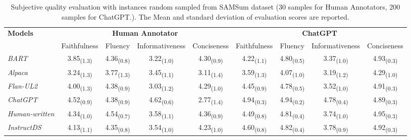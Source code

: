 \documentclass[11pt]{article}
\begin{document}
\begin{table*}[t]
        \centering
        \begin{adjustbox}{width=1.0\textwidth,center}
        \begin{tabular}{ | l | c c c c | c c c c | }
        \toprule
        \multirow{2}{*}{\textbf{Models}} & \multicolumn{4}{c|}{\textbf{Human Annotator}} & \multicolumn{4}{c|}{\textbf{ChatGPT}} \\ \cline{2-9}
         & Faithfulness & Fluency & Informativeness & Conciseness & Faithfulness & Fluency & Informativeness & Conciseness  \\
        \hline
        \emph{BART} & 3.85\textsubscript{(1.3)} & 4.36\textsubscript{(0.8)} & 3.22\textsubscript{(1.0)} & 4.30\textsubscript{(0.9)} & 4.22\textsubscript{(1.1)} & 4.80\textsubscript{(0.5)} & 3.37\textsubscript{(1.0)} & 4.93\textsubscript{(0.3)} \\
        \emph{Alpaca} & 3.24\textsubscript{(1.3)} & 3.77\textsubscript{(1.3)} & 3.45\textsubscript{(1.1)} & 3.11\textsubscript{(1.4)} & 3.59\textsubscript{(1.3)} & 4.07\textsubscript{(1.0)} & 3.19\textsubscript{(1.2)} & 4.29\textsubscript{(1.0)} \\
        \emph{Flan-UL2} & 4.00\textsubscript{(1.3)} & 4.38\textsubscript{(0.9)} & 3.03\textsubscript{(1.2)} & 4.29\textsubscript{(1.0)} & 4.45\textsubscript{(0.9)} & 4.78\textsubscript{(0.5)} & 3.52\textsubscript{(1.0)} & 4.91\textsubscript{(0.3)}  \\
        \emph{ChatGPT} & 4.52\textsubscript{(0.9)} & 4.38\textsubscript{(0.9)} & 4.62\textsubscript{(0.6)} & 2.77\textsubscript{(1.4)} & 4.94\textsubscript{(0.3)} & 4.94\textsubscript{(0.2)} & 4.78\textsubscript{(0.4)} & 4.89\textsubscript{(0.3)} \\ 
        \hline
        \emph{Human-written} & 4.34\textsubscript{(1.0)} & 4.54\textsubscript{(0.7)} & 3.58\textsubscript{(1.1)} & 4.36\textsubscript{(0.9)} & 4.49\textsubscript{(0.8)} & 4.81\textsubscript{(0.4)} & 3.74\textsubscript{(1.0)} & 4.95\textsubscript{(0.3)} \\
        \hline
        \emph{InstructDS} & 4.13\textsubscript{(1.1)} & 4.35\textsubscript{(0.8)} & 3.54\textsubscript{(1.0)} & 4.23\textsubscript{(1.0)} & 4.60\textsubscript{(0.8)} & 4.82\textsubscript{(0.4)} & 3.78\textsubscript{(0.9)} & 4.92\textsubscript{(0.3)}  \\
        \bottomrule
        \end{tabular}
        \end{adjustbox}
            \caption{Subjective quality evaluation with instances random sampled from SAMSum dataset (30 samples for Human Annotators, 200 samples for ChatGPT.). The Mean and standard deviation of evaluation scores are reported.}
        \label{tab:human_gpt_eval}
    \end{table*}
\end{document}
